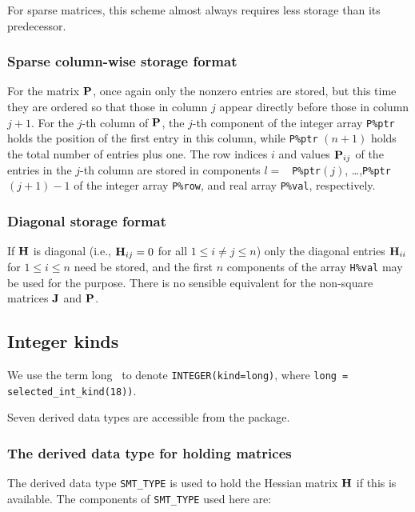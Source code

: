 \documentclass{galahad}
\begin{document}
For sparse matrices, this scheme almost always requires less storage than
its predecessor.

\subsubsection{Sparse column-wise storage format}\label{columnwise}
For the matrix ${\mathbf{P}}$, once again only the nonzero entries are
stored, but this time they are ordered so that those in column $j$ appear
directly before those in column $j+1$. For the $j$-th column of ${\mathbf{P}}$, the
$j$-th component of the integer array {\tt P\%ptr} holds the position of the
first entry in this column, while {\tt P\%ptr} $(n+1)$ holds the total number
of entries plus one.  The row indices $i$ and values ${\mathbf{P}}_{ij}$ of the
entries in the $j$-th column are stored in components $l =$ {\tt
  P\%ptr}$(j)$, \ldots ,{\tt P\%ptr} $(j+1)-1$ of the integer array
{\tt P\%row}, and real array {\tt P\%val}, respectively.

\subsubsection{Diagonal storage format}\label{diagonal}
If ${\mathbf{H}}$ is diagonal (i.e., ${\mathbf{H}}_{ij} = 0$ for all $1 \leq i \neq j \leq n$)
only the diagonal entries ${\mathbf{H}}_{ii}$ for $1 \leq i \leq n$ need be stored,
and the first $n$ components of the array {\tt H\%val} may be used for
the purpose. There is no sensible equivalent for the non-square
matrices ${\mathbf{J}}$ and ${\mathbf{P}}$.


\subsection{Integer kinds}\label{Integer kinds}
We use the term
long \integer\ to denote {\tt INTEGER\-(kind=long)}, where
{\tt long = selected\_int\_kind(18))}.


\galtypes
Seven derived data types are accessible from the package.


\subsubsection{The derived data type for holding matrices}\label{typesmt}
The derived data type {\tt SMT\_TYPE} is used to hold the Hessian matrix ${\mathbf{H}}$
if this is available. The components of {\tt SMT\_TYPE} used here are:
\end{document}
